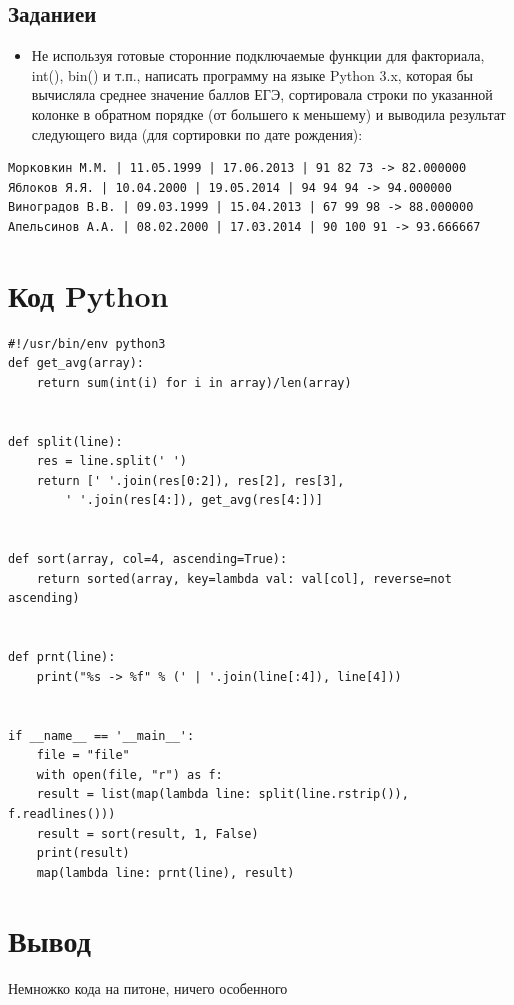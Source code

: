\documentclass[11pt]{article}
\begin{document}
\subsection{Заданиеи}
\label{sec:orgaa3348c}
\normalsize
\begin{itemize}
\item Не используя готовые сторонние подключаемые функции для факториала, int(), bin() и т.п., написать программу на языке Python 3.x, которая бы вычисляла среднее значение баллов ЕГЭ, сортировала строки по указанной колонке в обратном порядке (от большего к меньшему) и выводила результат следующего вида (для сортировки по дате рождения):
\end{itemize}
\scriptsize
\begin{verbatim}
Морковкин М.М. | 11.05.1999 | 17.06.2013 | 91 82 73 -> 82.000000
Яблоков Я.Я. | 10.04.2000 | 19.05.2014 | 94 94 94 -> 94.000000
Виноградов В.В. | 09.03.1999 | 15.04.2013 | 67 99 98 -> 88.000000
Апельсинов А.А. | 08.02.2000 | 17.03.2014 | 90 100 91 -> 93.666667
\end{verbatim}

\section{Код Python}
\label{sec:org33f9800}
\scriptsize
\lstset{language=Python,label= ,caption= ,captionpos=b,numbers=none}
\begin{lstlisting}
#!/usr/bin/env python3
def get_avg(array):
    return sum(int(i) for i in array)/len(array)


def split(line):
    res = line.split(' ')
    return [' '.join(res[0:2]), res[2], res[3],
	    ' '.join(res[4:]), get_avg(res[4:])]


def sort(array, col=4, ascending=True):
    return sorted(array, key=lambda val: val[col], reverse=not ascending)


def prnt(line):
    print("%s -> %f" % (' | '.join(line[:4]), line[4]))


if __name__ == '__main__':
    file = "file"
    with open(file, "r") as f:
	result = list(map(lambda line: split(line.rstrip()), f.readlines()))
    result = sort(result, 1, False)
    print(result)
    map(lambda line: prnt(line), result)
\end{lstlisting}

\section{Вывод}
\label{sec:org9e0eacf}
\normalsize
Немножко кода на питоне, ничего особенного
\end{document}
